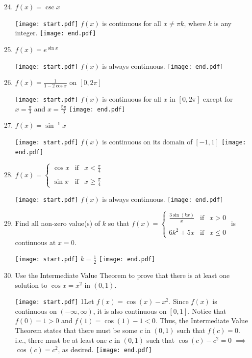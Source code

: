 \documentclass[12pt]{article}
\begin{document}
\begin{enumerate}
\setcounter{enumi}{23}

\item $f(x) = \csc{x}$ 

\texttt{[image: start.pdf]}
{{$f(x)$ is continuous for all $x \neq \pi k$, where $k$ is any integer.}}
\texttt{[image: end.pdf]}


\item $f(x) = e^{\sin {x}}$

\texttt{[image: start.pdf]}
{{$f(x)$ is always continuous.}}
\texttt{[image: end.pdf]}


\item $\displaystyle f(x) = \frac{1}{1-2\cos{x}}$ on $[0,2\pi]$ 

\texttt{[image: start.pdf]}
{{$f(x)$ is continuous for all $x$ in $[0,2\pi]$ except for $\displaystyle x=\frac{\pi}{3}$ and $\displaystyle x=\frac{5\pi}{3}$}}
\texttt{[image: end.pdf]}


\item $f(x) = \sin^{-1}{x}$ 

\texttt{[image: start.pdf]}
{{$f(x)$ is continuous on its domain of $[-1,1]$}}
\texttt{[image: end.pdf]}


\item $\displaystyle f(x)=\left\{
\begin{array}{lll}
\cos{x} & \text{if} & x< \frac{\pi}{4}\\
&\\
\sin{x} & \text{if} & x\geq \frac{\pi}{4}
\end{array}\right.$

\texttt{[image: start.pdf]}
{{$f(x)$ is always continuous.}}
\texttt{[image: end.pdf]}


\item Find all non-zero value(s) of $k$ so that $\displaystyle f(x)=\left\{\begin{array}{lll}
\frac{3\sin{(kx)}}{x} & \text{if} & x>0\\
&&\\
6k^2+5x & \text{if} & x \leq 0
\end{array}\right.$
is continuous at $x=0$.

\texttt{[image: start.pdf]}
{{$\displaystyle k=\frac{1}{2}$}}
\texttt{[image: end.pdf]}


\item Use the Intermediate Value Theorem to prove that there is at least one solution to $\cos{x}=x^2$ in $(0,1)$.

\texttt{[image: start.pdf]}
{{{1\linewidth}{Let $f(x)=\cos{(x)}-x^2$.  Since $f(x)$ is continuous on $(-\infty,\infty)$, it is also continuous on $[0,1]$.  Notice that $f(0)=1>0$ and $f(1)=\cos{(1)}-1<0$.  Thus, the Intermediate Value Theorem states that there must be some $c$ in $(0,1)$ such that $f(c)=0$.  i.e., there must be at least one $c$ in $(0,1)$ such that $\cos(c)-c^2=0$ $\implies$ $\cos{(c)}=c^2$, as desired.}}}
\texttt{[image: end.pdf]}



\end{enumerate}
\end{document}
